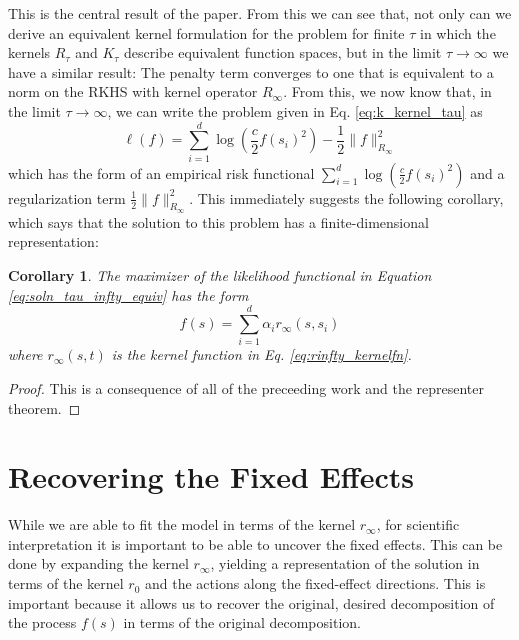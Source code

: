 \documentclass[ejsv2,preprint]{imsart}
\newtheorem{corollary}{Corollary}[section]
\begin{document}
This is the central result of the paper. From this we can see that, not only can we derive an equivalent kernel formulation for the problem for finite $\tau$ in which the kernels $R_\tau$ and $K_\tau$ describe equivalent function spaces, but in the limit $\tau\to\infty$ we have a similar result: The penalty term converges to one that is equivalent to a norm on the RKHS with kernel operator $R_\infty$. From this, we now know that, in the limit $\tau\to\infty$, we can write the problem given in Eq. \eqref{eq:k_kernel_tau} as
\begin{equation}\label{eq:soln_tau_infty_equiv}
    \ell(f) = \sum_{i=1}^d\log\left(\frac{c}{2}f(s_i)^2\right)-\frac{1}{2}\|f\|_{R_\infty}^2
\end{equation}
which has the form of an empirical risk functional $\sum_{i=1}^d\log\left(\frac{c}{2}f(s_i)^2\right)$ and a regularization term $\frac{1}{2}\|f\|^2_{R_\infty}$. This immediately suggests the following corollary, which says that the solution to this problem has a finite-dimensional representation:
\begin{corollary}\label{cor:representer_cor}
    The maximizer of the likelihood functional in Equation \eqref{eq:soln_tau_infty_equiv} has the form 
    \begin{equation}\label{eq:repthm_minimizer}
    f(s)=\sum_{i=1}^d\alpha_ir_\infty(s,s_i)
    \end{equation}
    where $r_\infty(s,t)$ is the kernel function in Eq. \eqref{eq:rinfty_kernelfn}.
\end{corollary}
\begin{proof}
    This is a consequence of all of the preceeding work and the representer theorem.
\end{proof}


\section{Recovering the Fixed Effects}

While we are able to fit the model in terms of the kernel $r_\infty$, for scientific interpretation it is important to be able to uncover the fixed effects. This can be done by expanding the kernel $r_\infty$, yielding a representation of the solution in terms of the kernel $r_0$ and the actions along the fixed-effect directions. This is important because it allows us to recover the original, desired decomposition of the process $f(s)$ in terms of the original decomposition. 
\end{document}
